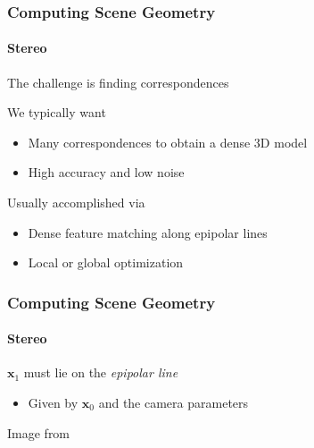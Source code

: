 \documentclass[xetex,professionalfont]{beamer}
\renewcommand{\vec}[1]{\ensuremath{\mathbf{#1}}}
\newcommand{\vx}{\vec{x}}
\begin{document}
\begin{frame}
\frametitle{Computing Scene Geometry}
\framesubtitle{Stereo}

The challenge is finding correspondences

\bigskip
We typically want
\begin{itemize}
    \item Many correspondences to obtain a dense 3D model
    \item High accuracy and low noise
\end{itemize}

\bigskip
Usually accomplished via
\begin{itemize}
    \item Dense feature matching along epipolar lines
    \item Local or global optimization %
\end{itemize}

\end{frame}


\begin{frame}
\frametitle{Computing Scene Geometry}
\framesubtitle{Stereo}

$\vx_1$ must lie on the \emph{epipolar line}
\begin{itemize}
    \item Given by $\vx_0$ and the camera parameters
\end{itemize}

\begin{center}
    {\centering Image from \cite{szeliski2010}}
\end{center}

\end{frame}
\end{document}
